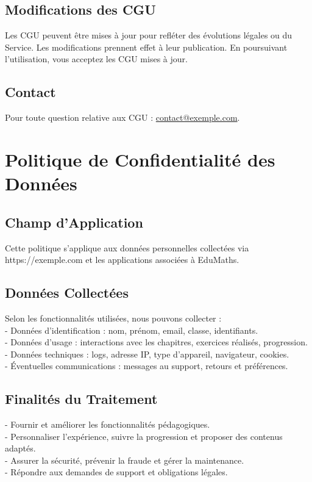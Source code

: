 \documentclass[12pt]{article}
\makeatletter
\newcommand{\NomService}{EduMaths}
\newcommand{\ContactEmail}{contact@exemple.com}
\newcommand{\SiteURL}{https://exemple.com}
\makeatother
\begin{document}
\subsection{Modifications des CGU}
Les CGU peuvent être mises à jour pour refléter des évolutions légales ou du Service. Les modifications prennent effet à leur publication. En poursuivant l'utilisation, vous acceptez les CGU mises à jour.

\subsection{Contact}
Pour toute question relative aux CGU : \href{mailto:\ContactEmail}{\ContactEmail}.

\section{Politique de Confidentialité des Données}
\subsection{Champ d'Application}
Cette politique s'applique aux données personnelles collectées via \SiteURL{} et les applications associées à \NomService{}.

\subsection{Données Collectées}
Selon les fonctionnalités utilisées, nous pouvons collecter :\\
- Données d'identification : nom, prénom, email, classe, identifiants.\\
- Données d'usage : interactions avec les chapitres, exercices réalisés, progression.\\
- Données techniques : logs, adresse IP, type d'appareil, navigateur, cookies.\\
- Éventuelles communications : messages au support, retours et préférences.

\subsection{Finalités du Traitement}
- Fournir et améliorer les fonctionnalités pédagogiques.\\
- Personnaliser l'expérience, suivre la progression et proposer des contenus adaptés.\\
- Assurer la sécurité, prévenir la fraude et gérer la maintenance.\\
- Répondre aux demandes de support et obligations légales.
\end{document}
